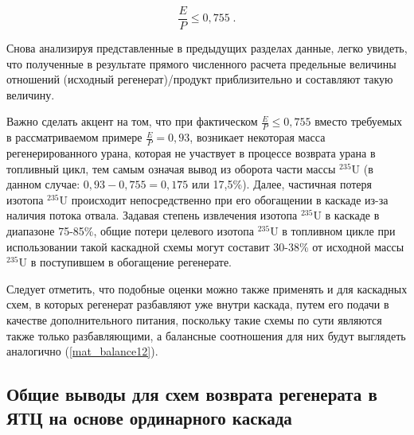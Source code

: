 
\begin{equation}
  \label{eq_232_balance_X_}
    \frac{E}{P} \leq 0,755 \; .
\end{equation}

Снова анализируя представленные в предыдущих разделах данные, легко увидеть, что полученные в результате прямого численного расчета предельные величины отношений (исходный регенерат)/продукт приблизительно и составляют такую величину.

Важно сделать акцент на том, что при фактическом $\frac{E}{P}\leq 0,755$ вместо требуемых в рассматриваемом примере $\frac{E}{P}=0,93$, возникает некоторая масса регенерированного урана, которая не участвует в процессе возврата урана в топливный цикл, тем самым означая вывод из оборота части массы $^{235}$U (в данном случае: $0,93-0,755=0,175$ или 17,5\%). Далее, частичная потеря изотопа $^{235}$U происходит непосредственно при его обогащении в каскаде из-за наличия потока отвала. Задавая степень извлечения изотопа $^{235}$U в каскаде в диапазоне 75-85\%, общие потери целевого изотопа $^{235}$U в топливном цикле при использовании такой каскадной схемы могут составит 30-38\% от исходной массы $^{235}$U в поступившем в обогащение регенерате.

Следует отметить, что подобные оценки можно также применять и для каскадных схем, в которых регенерат разбавляют уже внутри каскада, путем его подачи в качестве дополнительного питания, поскольку такие схемы по сути являются также только разбавляющими, а балансные соотношения для них будут выглядеть аналогично (\ref{mat_balance12}).

\subsection{Общие выводы для схем возврата регенерата в ЯТЦ на основе ординарного каскада}

